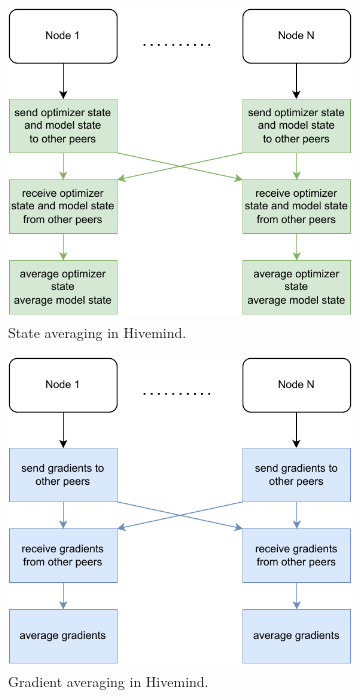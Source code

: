 \begin{figure}[h]
    \centering
    \begin{subfigure}[b]{0.475 \textwidth}
        \centering
        \caption{State averaging in Hivemind.}
        \label{fig:state-averaging}
        \includegraphics[width=\textwidth]{./figures/02_optimizer_averaging.pdf}
    \end{subfigure}%
    \hfill
    \begin{subfigure}[b]{0.475 \textwidth}
        \centering
        \caption{Gradient averaging in Hivemind.}
        \label{fig:gradient-averaging}
        \includegraphics[width=\textwidth]{./figures/02_gradient_averaging.pdf}
    \end{subfigure}
    \caption{}
\end{figure}

